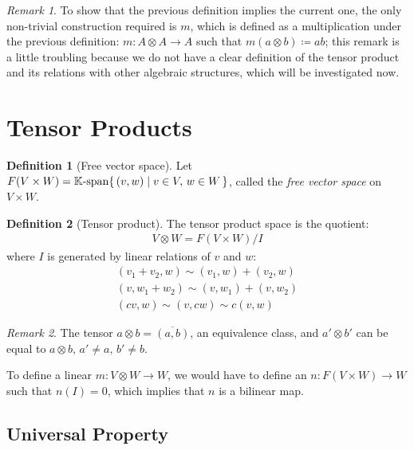 \documentclass[svgnames]{article}
\theoremstyle{definition}
\newtheorem{Definition}{Definition}
\theoremstyle{remark}
\newtheorem*{Remark*}{Remark}
\theoremstyle{underline}
\theoremstyle{underline}
\begin{document}
	\begin{Remark*}
		To show that the previous definition implies the current one, the only non-trivial construction required is $m$, which is defined as a multiplication under the previous definition: $m \colon A \otimes A \rightarrow A$ such that $ m(a \otimes b) \coloneqq ab $; this remark is a little troubling because we do not have a clear definition of the tensor product and its relations with other algebraic structures, which will be investigated now.
	\end{Remark*}
	
	\section{Tensor Products}
	
	\begin{Definition}[Free vector space]
		Let $F(V \times W) = \mathbb K\text{-}\mathrm{span}\qty{\, (v, w) \mid v \in V,\, w \in W\, }$, called the \emph{free vector space} on $V \times W$.
	\end{Definition}
	
	\begin{Definition}[Tensor product]
		The tensor product space is the quotient:
		\begin{gather*}
		V \otimes W = F(V \times W)/I
		\end{gather*}
		where $I$ is generated by linear relations of $v$ and $w$:
		\begin{gather*}
		(v_1 + v_2, w) \sim (v_1, w) + (v_2, w) \\
		(v, w_1 + w_2) \sim (v, w_1) + (v, w_2) \\
		(cv, w) \sim (v, cw) \sim c(v, w)
		\end{gather*}
	\end{Definition}
	
	\begin{Remark*}
		The tensor $a \otimes b = \overline{(a,b)}$, an equivalence class, and $a' \otimes b'$ can be equal to $a \otimes b,\, a' \neq a, \, b' \neq b$.
	\end{Remark*}
	
	To define a linear $m \colon V \otimes W \to W$, we would have to define an $n \colon F(V \times W) \to W$ such that $n(I) = 0$, which implies that $n$ is a bilinear map. 

	\subsection{Universal Property}
\end{document}
